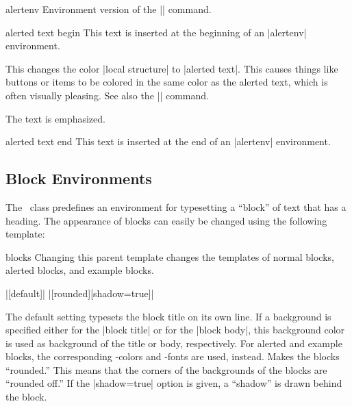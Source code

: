 \begin{environment}{{alertenv}}
  Environment version of the |\alert| command.

  \begin{element}{alerted text begin}\yes\no\no
    This text is inserted at the beginning of an |alertenv| environment.

    \begin{templateoptions}

      \beamernote
      This changes the color |local structure| to |alerted text|. This causes things like buttons or items to be colored in the same color as the alerted text, which is often visually pleasing. See also the |\structure| command.

      \articlenote
      The text is emphasized.
    \end{templateoptions}
  \end{element}

  \begin{element}{alerted text end}\yes\no\no
    This text is inserted at the end of an |alertenv| environment.
  \end{element}
\end{environment}


\subsection{Block Environments}
\label{predefined}

The \beamer\ class predefines an environment for typesetting a ``block'' of text that has a heading. The appearance of blocks can easily be changed using the following template:

\begin{element}{blocks}\semiyes\no\no
  Changing this parent template changes the templates of normal blocks, alerted blocks, and example blocks.

  \example
  |[default]|
  \example
  |[rounded][shadow=true]|

  \begin{templateoptions}
    The default setting typesets the block title on its own line. If a background is specified either for the |block title| or for the |block body|, this background color is used as background of the title or body, respectively. For alerted and example blocks, the corresponding \beamer-colors and -fonts are used, instead.
    Makes the blocks ``rounded.'' This means that the corners of the backgrounds of the blocks are ``rounded off.'' If the |shadow=true| option is given, a ``shadow'' is drawn behind the block.
  \end{templateoptions}
\end{element}


